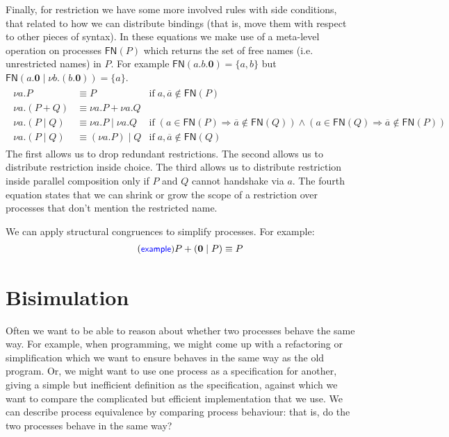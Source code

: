 \documentclass{article}
\newcommand{\exampleLabel}{\tag{\small{\textcolor{blue}{\textsf{example}}}}}
\theoremstyle{definition}
\begin{document}
Finally, for restriction we have some more involved rules
with side conditions, that related to how we can distribute
bindings (that is, move them with respect to other pieces
of syntax). In these equations we make use of a meta-level
operation on processes $\mathsf{FN}(P)$ which returns the
set of free names (i.e. unrestricted names) in $P$.
For example $\mathsf{FN}(a.b.\mathbf{0}) = \{a, b\}$
but $\mathsf{FN}(a.\mathbf{0} \mid \nu b . (b . \mathbf{0})) =
\{a \}$.
%
\begin{align*}
  \begin{array}{rll}
  \nu a . P & \equiv P & \text{if} \; a,
  \overline{a} \not\in \mathsf{FN}(P)  \\
 \nu a . (P + Q) & \equiv \nu a . P + \nu a . Q \\
 \nu a. (P \mid Q) & \equiv \nu a. P \mid \nu a. Q & \text{if}\;(a
  \in \mathsf{FN}(P) \Rightarrow \overline{a} \notin \mathsf{FN}(Q))
 \wedge (a \in \mathsf{FN}(Q) \Rightarrow \overline{a} \not\in
  \mathsf{FN}(P))  \\
\nu a. (P \mid Q) & \equiv (\nu a. P) \mid Q &\text{if}\;a,
                                               \overline{a} \not\in
                                               \mathsf{FN}(Q)
\end{array}
\end{align*}
%
The first allows us to drop redundant restrictions. The second allows
us to distribute restriction inside choice. The third allows us to
distribute restriction inside parallel composition only if
$P$ and $Q$ cannot handshake via $a$. The fourth equation
states that we can shrink or grow the scope of a restriction
over processes that don't mention the restricted name.

We can apply structural congruences to simplify processes. For
example:
%
\begin{align*}
  \exampleLabel{}
  P + (\mathbf{0} \mid P) \equiv P
\end{align*}
%

\section{Bisimulation}

Often we want to be able to reason about whether two processes behave
the same way. For example, when programming, we might come up with a
refactoring or simplification which we want to ensure behaves in the
same way as the old program. Or, we might want to use one process
as a specification for another, giving a simple but inefficient
definition as the specification, against which we want to compare the
complicated but efficient implementation that we use. We can
describe process equivalence by comparing process behaviour:
that is, do the two processes behave in the same way?
\end{document}
